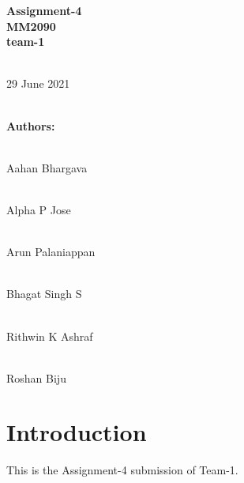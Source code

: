 \documentclass[a4paper, 12pt]{article}
\begin{document}
\begin{center}
 \huge{\textbf{Assignment-4}}
 \vspace{1cm}
 \\\huge{\textbf{MM2090}}
 \vspace{1cm}
 \\\huge{\textbf{team-1}}
 
 \vspace{1cm}
 
 \\29 June 2021
 
 \vspace{3cm}
 
 \\\textbf{\LARGE{Authors:}}
 
 \vspace{0.5cm}
 \\\LARGE{Aahan Bhargava {\selectfont [ME20B001]}}

 \vspace{0.5cm}
 \\\LARGE{Alpha P Jose {\selectfont [ME20B021]}}

 \vspace{0.5cm}
 \\\LARGE{Arun Palaniappan {\selectfont [ME20B036]}}

 \vspace{0.5cm}
 \\\LARGE{Bhagat Singh S {\selectfont [MM20B011]}}

 \vspace{0.5cm}
 \\\LARGE{Rithwin K Ashraf {\selectfont [ME20B150]}}

 \vspace{0.5cm}
 \\\LARGE{Roshan Biju {\selectfont [MM20B052]}}

\end{center}
\newpage

\tableofcontents

\vspace{3cm}

\section{Introduction}

This is the Assignment-4 submission of Team-1.
\newpage



\newpage

\newpage

\newpage

\newpage




\newpage


\end{document}
